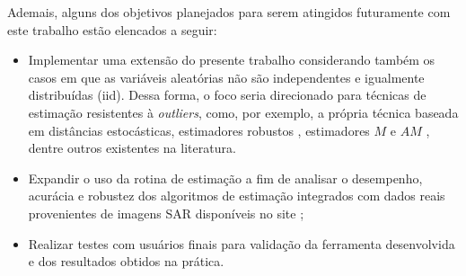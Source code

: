 Ademais, alguns dos objetivos planejados para serem atingidos futuramente com este trabalho estão elencados a seguir:
\begin{itemize}
    \item Implementar uma extensão do presente trabalho considerando também os casos em que as variáveis aleatórias não são independentes e igualmente distribuídas (iid). Dessa forma, o foco seria direcionado para técnicas de estimação resistentes à \textit{outliers}, como, por exemplo, a própria técnica baseada em distâncias estocásticas, estimadores robustos \citep{Wang2017}, estimadores $M$ e $AM$ \citep{AllendeFreryetal:JSCS:05}, dentre outros existentes na literatura.
    \item Expandir o uso da rotina de estimação a fim de analisar o desempenho, acurácia e robustez dos algoritmos de estimação integrados com dados reais provenientes de imagens SAR disponíveis no site \citet{PoISARpro};
    \item Realizar testes com usuários finais para validação da ferramenta desenvolvida e dos resultados obtidos na prática.
\end{itemize}